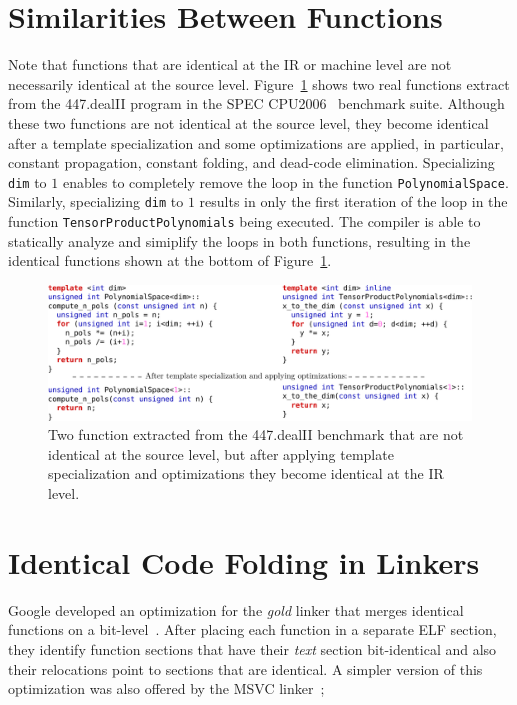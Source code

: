 
\section{Similarities Between Functions}

Note that functions that are identical at the IR or machine level are not
necessarily identical at the source level.
Figure~\ref{fig:identical-example} shows two real functions extract from the
447.dealII program in the SPEC CPU2006~\cite{spec} benchmark suite.
Although these two functions are not identical at the source level, they become
identical after a template specialization and some optimizations are applied, in
particular, constant propagation, constant folding, and dead-code elimination. 
Specializing \verb|dim| to $1$ enables to completely remove the loop in the
function \verb|PolynomialSpace|.
Similarly, specializing \verb|dim| to $1$ results in only the first iteration
of the loop in the function \verb|TensorProductPolynomials| being executed.
The compiler is able to statically analyze and simiplify the loops in both
functions, resulting in the identical functions shown at the bottom of
Figure~\ref{fig:identical-example}.

\begin{figure}[h]
\centering
\includegraphics[width=\textwidth]{src/relatedwork/figs/identical-example}
\caption{Two function extracted from the 447.dealII benchmark that are not
           identical at the source level, but after applying template
           specialization and optimizations they become identical at the IR
           level.}
\label{fig:identical-example}
\end{figure}

\section{Identical Code Folding in Linkers}


Google developed an optimization for the \textit{gold} linker that merges
identical functions on a bit-level~\cite{tallam10,kwan12}.
After placing each function in a separate ELF section, they identify function
sections that have their \textit{text} section bit-identical and also their
relocations point to sections that are identical. A simpler version of this
optimization was also offered by the MSVC linker~\cite{msvc-icf};


